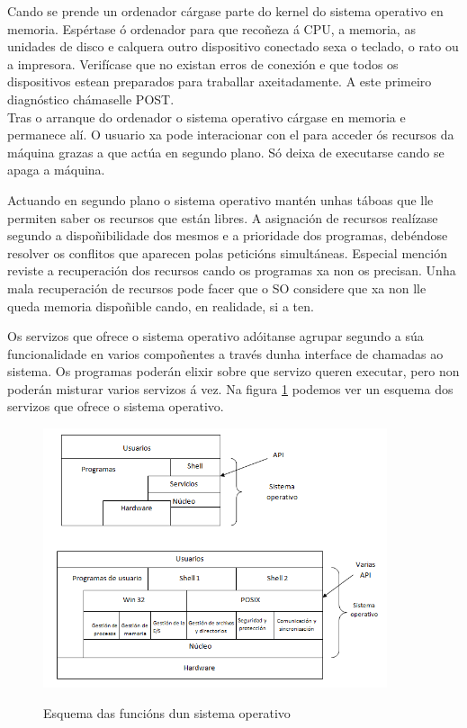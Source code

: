 
Cando se prende un ordenador cárgase parte do kernel do  sistema operativo en memoria. Espértase ó ordenador para que recoñeza á CPU, a memoria, as unidades de disco e calquera outro dispositivo conectado sexa o teclado, o rato ou a impresora. Verifícase que no existan erros de conexión e que todos os dispositivos estean preparados para traballar axeitadamente. A este primeiro diagnóstico chámaselle POST.\\

Tras o arranque do ordenador o sistema operativo cárgase en memoria e permanece alí. O usuario xa pode interacionar con el para acceder ós recursos da máquina grazas a que actúa en segundo plano. Só deixa de executarse cando se apaga a máquina. 

Actuando en segundo plano o sistema operativo mantén unhas táboas que lle permiten saber os recursos que están libres.  A asignación de recursos realízase segundo a dispoñibilidade dos mesmos e a prioridade dos programas, debéndose resolver os conflitos que aparecen polas peticións simultáneas. Especial mención reviste a recuperación dos recursos cando os programas xa non os precisan. Unha mala recuperación de recursos pode facer que o SO considere que xa non lle queda memoria dispoñible cando, en realidade, si a ten.

Os servizos que ofrece o sistema operativo adóitanse agrupar segundo a súa funcionalidade en varios compoñentes a través dunha interface de chamadas ao sistema. Os programas poderán elixir sobre que servizo queren executar, pero non poderán misturar varios servizos á vez. Na figura \ref{servizos} podemos ver un esquema dos servizos que ofrece o sistema operativo.\\

\begin{figure} 
\begin{center}
\caption{Esquema das funcións dun sistema operativo}
\includegraphics[width=0.9\textwidth]{./debuxos/unid.png}
\label{servizos}
\end{center}
\end{figure}
